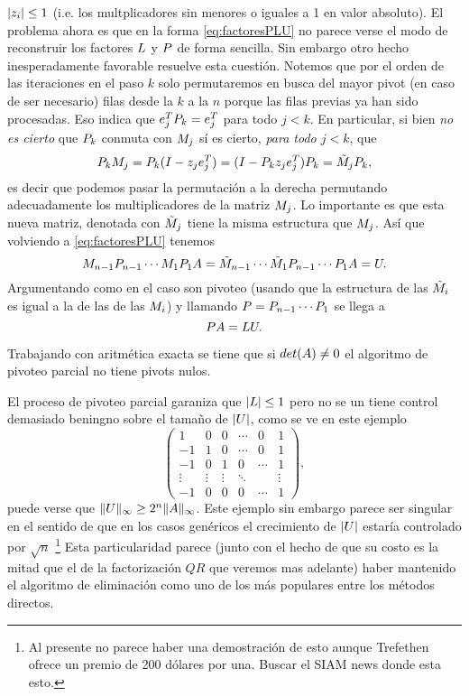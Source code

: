\begin{tcolorbox}
$|\zb_i|\le 1$ (i.e. los multplicadores sin menores o iguales a 1 en valor absoluto).
El problema ahora es que en la forma \eqref{eq:factoresPLU}  no parece verse el modo de reconstruir los factores $\Lb$ y $\Pb$ de forma sencilla. Sin embargo otro hecho inesperadamente favorable resuelve esta cuestión. Notemos que por el orden de las iteraciones en el paso $k$ solo permutaremos en busca del mayor pivot (en caso de ser necesario) filas desde la $k$ a la $n$ porque las filas previas ya han sido procesadas. Eso indica que
$\eb_j^T\Pb_k=\eb^T_j$ para todo $j<k$. En particular, si bien \emph{no es cierto} que $\Pb_k$
conmuta con $\Mb_j$ sí es cierto,
\emph{para todo $j<k$}, que
$$
\Pb_k\Mb_j=\Pb_k
(\Ib-\zb_{j}\eb_{j}^T)=
(\Ib-\Pb_k\zb_{j}\eb_{j}^T)\Pb_k=
\tilde\Mb_j \Pb_k,
$$
es decir que podemos pasar la permutación a la derecha permutando adecuadamente los multiplicadores de la matriz $\Mb_j$. Lo importante es que esta nueva matriz, denotada con $\tilde \Mb_j$ tiene la misma estructura que $\Mb_j$. Así que volviendo a  \eqref{eq:factoresPLU} tenemos
$$
\Mb_{n-1}\Pb_{n-1}\cdots \Mb_{1}\Pb_{1}\Ab= \tilde \Mb_{n-1}\cdots \tilde \Mb_{1} \Pb_{n-1}\cdots \Pb_{1}\Ab=\Ub.
$$
Argumentando como en el caso son pivoteo (usando que la estructura de las $\tilde \Mb_i$ es igual a la de las de las $\Mb_i$) y llamando
$\Pb=\Pb_{n-1}\cdots \Pb_{1}$ se llega a
$$
\Pb\Ab=\Lb\Ub.
$$

\begin{tcolorbox}
[colback=black!15!white,colframe=black!75!black] \begin{prop}
  Trabajando con aritmética exacta se tiene que si $det(\Ab)\neq 0$ el algoritmo de pivoteo parcial no tiene pivots nulos.
 \end{prop}
\end{tcolorbox}

\begin{tcolorbox}
[colback=black!15!white,colframe=black!75!black] \begin{rem}
\label{obs:malgauss}
El proceso de pivoteo parcial garaniza que $|\Lb|\le 1$ pero no
se un tiene control demasiado beningno sobre el tamaño de
$|\Ub|$, como se ve en este ejemplo
$$
\begin{pmatrix}
 1&0&0&\cdots&0&1\\
 -1&1&0&\cdots&0&1\\
 -1&0&1&0&\cdots&1 \\
 \vdots &\vdots&\vdots& \ddots&&\vdots\\
 -1&0&0&0&\cdots&1
\end{pmatrix},
$$
puede verse que $\|\Ub\|_\infty \ge 2^n\|\Ab\|_\infty$.
Este ejemplo sin embargo parece ser singular en el sentido de que en los casos genéricos el crecimiento de $|\Ub|$ estaría controlado por $\sqrt{n}$ \cite{TB} \footnote{Al presente no parece haber una demostración de esto aunque Trefethen ofrece un premio de 200 dólares por una. Buscar el SIAM news donde esta esto.} Esta particularidad parece (junto con el hecho de que su costo es la mitad que el de la factorización $QR$ que veremos mas adelante) haber mantenido el algoritmo de eliminación como uno de los más populares entre los métodos directos.
 \end{rem}
\end{tcolorbox}


\end{tcolorbox}
